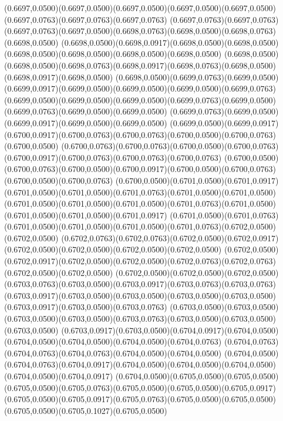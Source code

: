 (0.6697,0.0500)(0.6697,0.0500)(0.6697,0.0500)(0.6697,0.0500)(0.6697,0.0500)(0.6697,0.0763)(0.6697,0.0763)(0.6697,0.0763)
(0.6697,0.0763)(0.6697,0.0763)(0.6697,0.0763)(0.6697,0.0500)(0.6698,0.0763)(0.6698,0.0500)(0.6698,0.0763)(0.6698,0.0500)
(0.6698,0.0500)(0.6698,0.0917)(0.6698,0.0500)(0.6698,0.0500)(0.6698,0.0500)(0.6698,0.0500)(0.6698,0.0500)(0.6698,0.0500)
(0.6698,0.0500)(0.6698,0.0500)(0.6698,0.0763)(0.6698,0.0917)(0.6698,0.0763)(0.6698,0.0500)(0.6698,0.0917)(0.6698,0.0500)
(0.6698,0.0500)(0.6699,0.0763)(0.6699,0.0500)(0.6699,0.0917)(0.6699,0.0500)(0.6699,0.0500)(0.6699,0.0500)(0.6699,0.0763)
(0.6699,0.0500)(0.6699,0.0500)(0.6699,0.0500)(0.6699,0.0763)(0.6699,0.0500)(0.6699,0.0763)(0.6699,0.0500)(0.6699,0.0500)
(0.6699,0.0763)(0.6699,0.0500)(0.6699,0.0917)(0.6699,0.0500)(0.6699,0.0500)
\PST@Solid(0.6699,0.0500)(0.6699,0.0917)(0.6700,0.0917)(0.6700,0.0763)(0.6700,0.0763)(0.6700,0.0500)(0.6700,0.0763)(0.6700,0.0500)
(0.6700,0.0763)(0.6700,0.0763)(0.6700,0.0500)(0.6700,0.0763)(0.6700,0.0917)(0.6700,0.0763)(0.6700,0.0763)(0.6700,0.0763)
(0.6700,0.0500)(0.6700,0.0763)(0.6700,0.0500)(0.6700,0.0917)(0.6700,0.0500)(0.6700,0.0763)(0.6700,0.0500)(0.6700,0.0763)
(0.6700,0.0500)(0.6701,0.0500)(0.6701,0.0917)(0.6701,0.0500)(0.6701,0.0500)(0.6701,0.0763)(0.6701,0.0500)(0.6701,0.0500)
(0.6701,0.0500)(0.6701,0.0500)(0.6701,0.0500)(0.6701,0.0763)(0.6701,0.0500)(0.6701,0.0500)(0.6701,0.0500)(0.6701,0.0917)
(0.6701,0.0500)(0.6701,0.0763)(0.6701,0.0500)(0.6701,0.0500)(0.6701,0.0500)(0.6701,0.0763)(0.6702,0.0500)(0.6702,0.0500)
(0.6702,0.0763)(0.6702,0.0763)(0.6702,0.0500)(0.6702,0.0917)(0.6702,0.0500)(0.6702,0.0500)(0.6702,0.0500)(0.6702,0.0500)
(0.6702,0.0500)(0.6702,0.0917)(0.6702,0.0500)(0.6702,0.0500)(0.6702,0.0763)(0.6702,0.0763)(0.6702,0.0500)(0.6702,0.0500)
(0.6702,0.0500)(0.6702,0.0500)(0.6702,0.0500)(0.6703,0.0763)(0.6703,0.0500)(0.6703,0.0917)(0.6703,0.0763)(0.6703,0.0763)
(0.6703,0.0917)(0.6703,0.0500)(0.6703,0.0500)(0.6703,0.0500)(0.6703,0.0500)(0.6703,0.0917)(0.6703,0.0500)(0.6703,0.0763)
(0.6703,0.0500)(0.6703,0.0500)(0.6703,0.0500)(0.6703,0.0500)(0.6703,0.0763)(0.6703,0.0500)(0.6703,0.0500)(0.6703,0.0500)
(0.6703,0.0917)(0.6703,0.0500)(0.6704,0.0917)(0.6704,0.0500)(0.6704,0.0500)(0.6704,0.0500)(0.6704,0.0500)(0.6704,0.0763)
(0.6704,0.0763)(0.6704,0.0763)(0.6704,0.0763)(0.6704,0.0500)(0.6704,0.0500)
\PST@Solid(0.6704,0.0500)(0.6704,0.0763)(0.6704,0.0917)(0.6704,0.0500)(0.6704,0.0500)(0.6704,0.0500)(0.6704,0.0500)(0.6704,0.0917)
(0.6704,0.0500)(0.6705,0.0500)(0.6705,0.0500)(0.6705,0.0500)(0.6705,0.0763)(0.6705,0.0500)(0.6705,0.0500)(0.6705,0.0917)
(0.6705,0.0500)(0.6705,0.0917)(0.6705,0.0763)(0.6705,0.0500)(0.6705,0.0500)(0.6705,0.0500)(0.6705,0.1027)(0.6705,0.0500)
